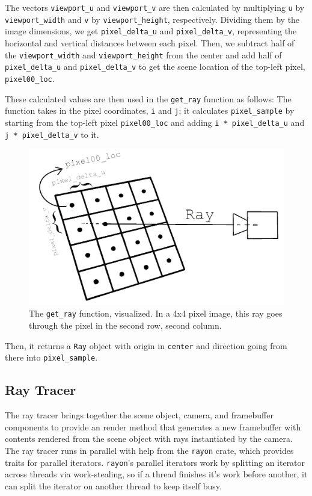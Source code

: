\documentclass[conference]{IEEEtran}
\begin{document}
The vectors \texttt{viewport\_u} and \texttt{viewport\_v} are then calculated by multiplying \texttt{u} by \texttt{viewport\_width} and \texttt{v} by \texttt{viewport\_height}, respectively.
Dividing them by the image dimensions, we get \texttt{pixel\_delta\_u} and \texttt{pixel\_delta\_v}, representing the horizontal and vertical distances between each pixel.
Then, we subtract half of the \texttt{viewport\_width} and \texttt{viewport\_height} from the center and add half of \texttt{pixel\_delta\_u} and \texttt{pixel\_delta\_v} to get the scene location of the top-left pixel, \texttt{pixel00\_loc}.

These calculated values are then used in the \texttt{get\_ray} function as follows:
The function takes in the pixel coordinates, \texttt{i} and \texttt{j}; it calculates \texttt{pixel\_sample} by starting from the top-left pixel \texttt{pixel00\_loc} and adding \texttt{i * pixel\_delta\_u} and \texttt{j * pixel\_delta\_v} to it.

\begin{figure}[htbp]
  \centerline{\includegraphics[width=\linewidth]{pixel-delta-grid}}
  \caption{The \texttt{get\_ray} function, visualized. In a 4x4 pixel image, this ray goes through the pixel in the second row, second column.}
  \label{pixel-delta-grid}
\end{figure}

Then, it returns a \texttt{Ray} object with origin in \texttt{center} and direction going from there into \texttt{pixel\_sample}.

\subsection{Ray Tracer}

The ray tracer brings together the scene object, camera, and framebuffer components to provide an render method that generates a new framebuffer with contents rendered from the scene object with rays instantiated by the camera.
The ray tracer runs in parallel with help from the \verb|rayon| crate, which provides traits for parallel iterators.
\verb|rayon|'s parallel iterators work by splitting an iterator across threads via work-stealing, so if a thread finishes it's work before another, it can split the iterator on another thread to keep itself busy.
\end{document}
